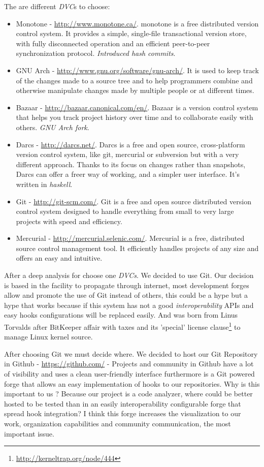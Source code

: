 \documentclass[11pt]{scrartcl}
\begin{document}
\par The are different \emph{DVC}s to choose:
\begin{itemize}
    \item Monotone - \url{http://www.monotone.ca/}. monotone is a free distributed version control system. It provides a simple, single-file transactional version store, with fully disconnected operation and an efficient peer-to-peer synchronization protocol. \emph{Introduced hash commits}.
	\item GNU Arch - \url{http://www.gnu.org/software/gnu-arch/}. It is used to keep track of the changes made to a source tree and to help programmers combine and otherwise manipulate changes made by multiple people or at different times.
	\item Bazaar - \url{http://bazaar.canonical.com/en/}. Bazaar is a version control system that helps you track project history over time and to collaborate easily with others. \emph{GNU Arch fork}.
	\item Darcs - \url{http://darcs.net/}. Darcs is a free and open source, cross-platform version control system, like git, mercurial or subversion but with a very different approach. Thanks to its focus on changes rather than snapshots, Darcs can offer a freer way of working, and a simpler user interface. It's written in \emph{haskell}.
	\item Git - \url{http://git-scm.com/}. Git is a free and open source distributed version control system designed to handle everything from small to very large projects with speed and efficiency.
	\item Mercurial - \url{http://mercurial.selenic.com/}. Mercurial is a free, distributed source control management tool. It efficiently handles projects of any size and offers an easy and intuitive. 
\end{itemize}

\par After a deep analysis for choose one \emph{DVCs}. We decided to use Git. Our decision is based in the facility to propagate through internet, most development forges allow and promote the use of Git instead of others, this could be a hype but a hype that works because if this system has not a good \emph{interoperability} APIs and easy hooks configurations will be replaced easily. And was born from Linus Torvalds after BitKeeper affair with taxes and its 'special' license clause\footnote{\url{http://kerneltrap.org/node/444}} to manage Linux kernel source.

\par After choosing Git we must decide where. We decided to host our Git Repository in Github - \url{https://github.com/} - Projects and community in Github have a lot of visibility and uses a clean user-friendly interface furthermore is a Git powered forge that allows an easy implementation of hooks to our repositories. Why is this important to us ? Because our project is a code analyzer, where could be better hosted to be tested than in an easily interoperability configurable forge that spread hook integration? I think this forge increases the visualization to our work, organization capabilities and community communication, the most important issue. 
\end{document}

